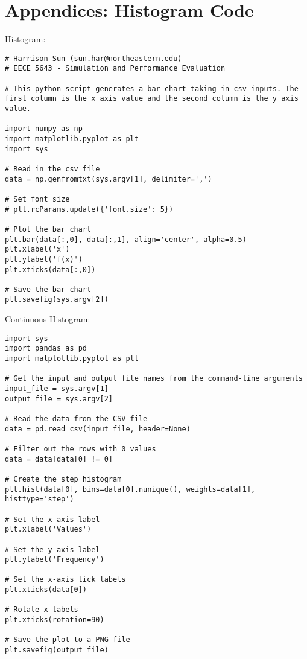 \documentclass[11]{article}
\begin{document}
\section{\textbf{Appendices: Histogram Code}}
\noindent Histogram:\\
\begin{lstlisting}[style=CStyle]
# Harrison Sun (sun.har@northeastern.edu)
# EECE 5643 - Simulation and Performance Evaluation

# This python script generates a bar chart taking in csv inputs. The first column is the x axis value and the second column is the y axis value.

import numpy as np
import matplotlib.pyplot as plt
import sys

# Read in the csv file
data = np.genfromtxt(sys.argv[1], delimiter=',')

# Set font size
# plt.rcParams.update({'font.size': 5})

# Plot the bar chart
plt.bar(data[:,0], data[:,1], align='center', alpha=0.5)
plt.xlabel('x')
plt.ylabel('f(x)')
plt.xticks(data[:,0])

# Save the bar chart
plt.savefig(sys.argv[2])

\end{lstlisting}
\newpage
\noindent Continuous Histogram:\\
\begin{lstlisting}[style=CStyle]
import sys
import pandas as pd
import matplotlib.pyplot as plt

# Get the input and output file names from the command-line arguments
input_file = sys.argv[1]
output_file = sys.argv[2]

# Read the data from the CSV file
data = pd.read_csv(input_file, header=None)

# Filter out the rows with 0 values
data = data[data[0] != 0]

# Create the step histogram
plt.hist(data[0], bins=data[0].nunique(), weights=data[1], histtype='step')

# Set the x-axis label
plt.xlabel('Values')

# Set the y-axis label
plt.ylabel('Frequency')

# Set the x-axis tick labels
plt.xticks(data[0])

# Rotate x labels
plt.xticks(rotation=90)

# Save the plot to a PNG file
plt.savefig(output_file)


\end{lstlisting}
\end{document}

